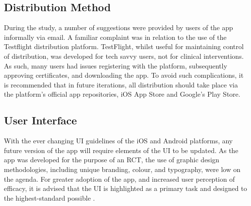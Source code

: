 \subsection{Distribution Method}
During the study, a number of suggestions were provided by users of the app informally via email. A familiar complaint was in relation to the use of the Testflight distribution platform. TestFlight, whilst useful for maintaining control of distribution, was developed for tech savvy users, not for clinical interventions. As such, many users had issues registering with the platform, subsequently approving certificates, and downloading the app. To avoid such complications, it is recommended that in future iterations, all distribution should take place via the platform’s official app repositories, iOS App Store and Google’s Play Store.


\subsection{User Interface}
With the ever changing UI guidelines of the iOS and Android platforms, any future version of the app will require elements of the UI to be updated. As the app was developed for the purpose of an RCT, the use of graphic design methodologies, including unique branding, colour, and typography, were low on the agenda. For greater adoption of the app, and increased user perception of efficacy, it is advised that the UI is highlighted as a primary task and designed to the highest-standard possible \cite{Soper2014}.

